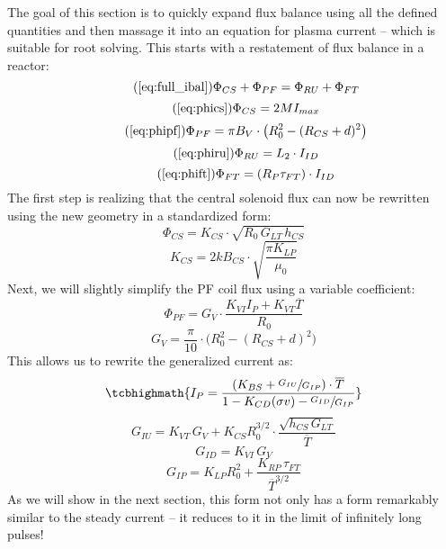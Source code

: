 The goal of this section is to quickly expand flux balance using all the defined quantities and then massage it into an equation for plasma current -- which is suitable for root solving. This starts with a restatement of flux balance in a reactor:
\begin{equation}
	\tag{\ref{eq:full_ibal}}
	\Phi_{CS} + \Phi_{PF} = \Phi_{RU} + \Phi_{FT}
\end{equation}
\begin{equation}
	\tag{\ref{eq:phics}}
	\Phi_{CS} = 2 M I_{max}
\end{equation}
\begin{equation}
	\tag{\ref{eq:phipf}}
	\Phi_{PF} = \pi B_V \cdot \left( R_0^2 - ( R_{CS} + d ) ^ 2 \right)
\end{equation}
\begin{equation}
	\tag{\ref{eq:phiru}}
	\Phi_{RU} = L_2 \cdot I_{ID}
\end{equation}
\begin{equation}
	\tag{\ref{eq:phift}}
	\Phi_{FT} = ( R_P \tau_{FT} ) \cdot I_{ID}
\end{equation}
The first step is realizing that the central solenoid flux can now be rewritten using the new geometry in a standardized form:
\begin{equation}
	\Phi_{CS} = K_{CS} \cdot \sqrt{ R_0 \, G_{LT} \, h_{CS} }
\end{equation}
\begin{equation}
	K_{CS} = 2 k B_{CS} \cdot \sqrt{ \frac{ \pi K_{LP} }{ \mu_0 } }
\end{equation}
Next, we will slightly simplify the PF coil flux using a  variable coefficient:
\begin{equation}
	\Phi_{PF} = G_V \cdot \frac{ K_{VI} I_P + K_{VT} \overline T }{R_0}
\end{equation}
\begin{equation}
	G_V = \frac{ \pi }{ 10 } \cdot \big( R_0^2 - \left( R_{CS} + d \right) ^2 \big)
\end{equation}
This allows us to rewrite the generalized current as:
\begin{equation}
	\label{eq:gen_ip}
	\tcbhighmath{
	I_P = \frac{ \left( K_{BS} + \sfrac{ G_{IU} }{ G_{IP} } \right) \cdot \overline T }{ 1 - K_{CD} ( \sigma v ) - \sfrac{ G_{ID} }{ G_{IP} } }
	}
\end{equation}
\begin{equation}
	G_{IU} = K_{VT} \, G_V + K_{CS} R_0^{3/2} \cdot \frac{ \sqrt{ h_{CS} \, G_{LT} } }{ \overline T }
\end{equation}
\begin{equation}
	G_{ID} = K_{VI} \, G_V
\end{equation}
\begin{equation}
	\label{eq:gip}
	G_{IP} = K_{LP} R_0^2 + \frac{ K_{RP} \, \tau_{FT} }{ \overline T ^ {3/2} }
\end{equation}
As we will show in the next section, this form not only has a form remarkably similar to the steady current -- it reduces to it in the limit of infinitely long pulses!

